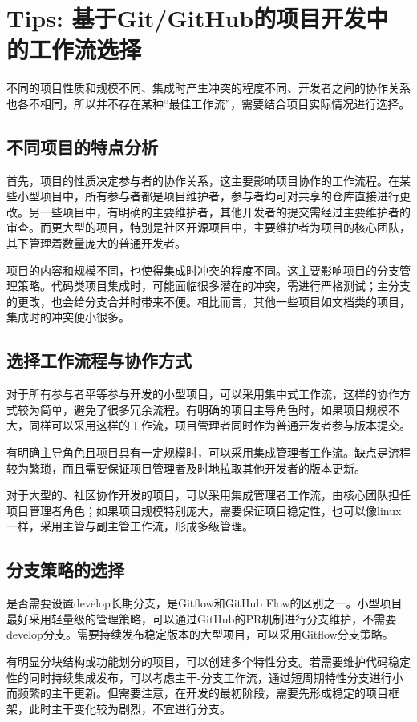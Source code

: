 \documentclass[../main.tex]{subfiles}
\begin{document}
\section{Tips: 基于Git/GitHub的项目开发中的工作流选择}

不同的项目性质和规模不同、集成时产生冲突的程度不同、开发者之间的协作关系也各不相同，所以并不存在某种“最佳工作流”，需要结合项目实际情况进行选择。

\subsection{不同项目的特点分析}

首先，项目的性质决定参与者的协作关系，这主要影响项目协作的工作流程。在某些小型项目中，所有参与者都是项目维护者，参与者均可对共享的仓库直接进行更改。另一些项目中，有明确的主要维护者，其他开发者的提交需经过主要维护者的审查。而更大型的项目，特别是社区开源项目中，主要维护者为项目的核心团队，其下管理着数量庞大的普通开发者。

项目的内容和规模不同，也使得集成时冲突的程度不同。这主要影响项目的分支管理策略。代码类项目集成时，可能面临很多潜在的冲突，需进行严格测试；主分支的更改，也会给分支合并时带来不便。相比而言，其他一些项目如文档类的项目，集成时的冲突便小很多。

\subsection{选择工作流程与协作方式}

对于所有参与者平等参与开发的小型项目，可以采用集中式工作流，这样的协作方式较为简单，避免了很多冗余流程。有明确的项目主导角色时，如果项目规模不大，同样可以采用这样的工作流，项目管理者同时作为普通开发者参与版本提交。

有明确主导角色且项目具有一定规模时，可以采用集成管理者工作流。缺点是流程较为繁琐，而且需要保证项目管理者及时地拉取其他开发者的版本更新。

对于大型的、社区协作开发的项目，可以采用集成管理者工作流，由核心团队担任项目管理者角色；如果项目规模特别庞大，需要保证项目稳定性，也可以像linux一样，采用主管与副主管工作流，形成多级管理。

\subsection{分支策略的选择}

是否需要设置develop长期分支，是Gitflow和GitHub Flow的区别之一。小型项目最好采用轻量级的管理策略，可以通过GitHub的PR机制进行分支维护，不需要develop分支。需要持续发布稳定版本的大型项目，可以采用Gitflow分支策略。

有明显分块结构或功能划分的项目，可以创建多个特性分支。若需要维护代码稳定性的同时持续集成发布，可以考虑主干-分支工作流，通过短周期特性分支进行小而频繁的主干更新。但需要注意，在开发的最初阶段，需要先形成稳定的项目框架，此时主干变化较为剧烈，不宜进行分支。
\end{document}

